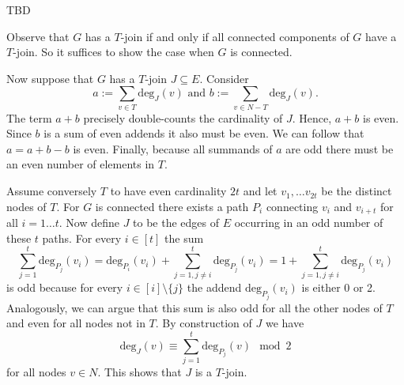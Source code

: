 \begin{aufgabe}
    TBD
\end{aufgabe}
\begin{aufgabe}
    Observe that $G$ has a $T$-join if and only if all connected components of $G$ have a $T$-join.
    So it suffices to show the case when $G$ is connected.
    
    Now suppose that $G$ has a $T$-join $J\subseteq E$.
    Consider $$a:=\sum_{v\in T}\text{deg}_J(v) \text{ and } b:=\sum_{v\in N - T}\text{deg}_J(v).$$
    The term $a+b$ precisely double-counts the cardinality of $J$.
    Hence, $a+b$ is even.
    Since $b$ is a sum of even addends it also must be even.
    We can follow that $a=a+b-b$ is even.
    Finally, because all summands of $a$ are odd there must be an even number of elements in $T$. 
    
    Assume conversely $T$ to have even cardinality $2t$ and let $v_1,\dots v_{2t}$ be the distinct nodes of $T$.
    For $G$ is connected there exists a path $P_i$ connecting $v_i$ and $v_{i+t}$ for all $i=1\dots t$.
    Now define $J$ to be the edges of $E$ occurring in an odd number of these $t$ paths.
    For every $i\in [t]$ the sum $$\sum_{j=1}^{t}\text{deg}_{P_j}(v_i) = \text{deg}_{P_i}(v_i) + \sum_{j=1, j\neq i}^{t}\text{deg}_{P_j}(v_i) = 1 + \sum_{j=1, j\neq i}^{t}\text{deg}_{P_j}(v_i)$$
    is odd because for every $i\in [i]\setminus\{j\}$ the addend $\text{deg}_{P_j}(v_i)$ is either 0 or 2.
    Analogously, we can argue that this sum is also odd for all the other nodes of $T$ and even for all nodes not in $T$.
    By construction of $J$ we have 
    $$\text{deg}_J(v) \equiv \sum_{j=1}^t \text{deg}_{P_j}(v) \mod{2}$$
    for all nodes $v\in N$.
    This shows that $J$ is a $T$-join.
\end{aufgabe}
